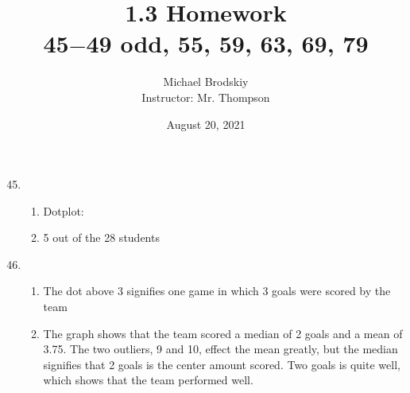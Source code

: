 \documentclass[12pt]{article}
\title{1.3 Homework\\45$-$49 odd, 55, 59, 63, 69, 79}
\date{August 20, 2021}
\author{Michael Brodskiy\\ \small Instructor: Mr. Thompson}
\begin{document}
\maketitle

\begin{enumerate}

    \setcounter{enumi}{44}

  \item

    \begin{enumerate}

      \item Dotplot:

        \begin{center}

    
        \end{center}

      \item 5 out of the 28 students

    \end{enumerate}

    \setcounter{enumi}{46}

  \item

    \begin{enumerate}

      \item The dot above 3 signifies one game in which 3 goals were scored by the team

      \item The graph shows that the team scored a median of 2 goals and a mean of 3.75. The two outliers, 9 and 10, effect the mean greatly, but the median signifies that 2 goals is the center amount scored. Two goals is quite well, which shows that the team performed well.


\end{enumerate}
\end{enumerate}
\end{document}
